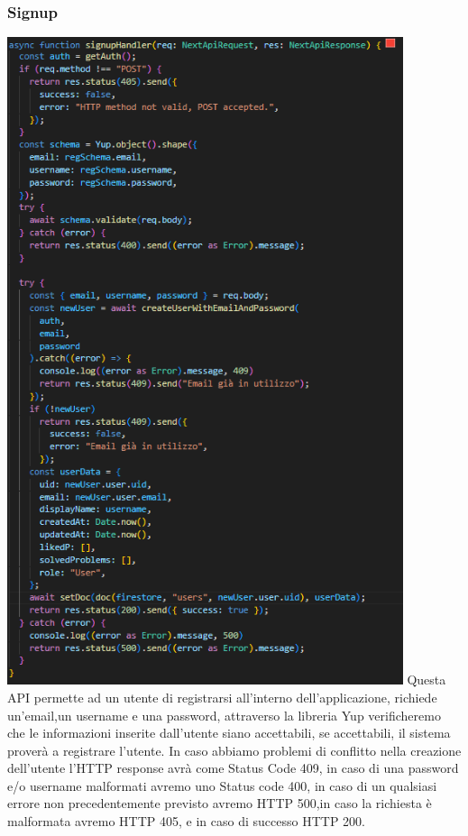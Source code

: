 \documentclass[11pt, a4paper]{article}
\theoremstyle{definition}
\begin{document}
\subsubsection{Signup}
\includegraphics[width=\textwidth,height=19cm]{materiale/API/signup.png}
Questa API permette ad un utente di registrarsi all'interno dell'applicazione, richiede un'email,un username e una password,
attraverso la libreria Yup verificheremo che le informazioni inserite dall'utente siano accettabili, se accettabili, il sistema proverà a registrare l'utente.
In caso abbiamo problemi di conflitto nella creazione dell'utente l'HTTP response avrà come Status Code 409, in caso di una password e/o username malformati avremo uno Status code 400, in caso di un qualsiasi errore non precedentemente previsto
avremo HTTP 500,in caso la richiesta è malformata avremo HTTP 405, e in caso di successo HTTP 200.
\end{document}
